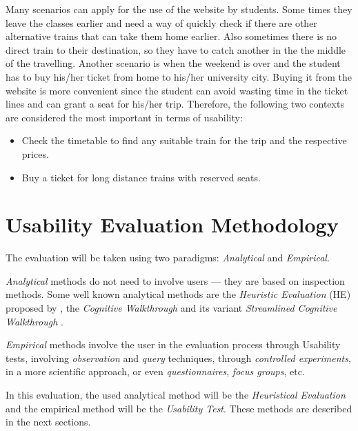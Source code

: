 \documentclass[a4paper]{article}
\begin{document}
Many scenarios can apply for the use of the website by students. Some times they leave the classes earlier and need a way of quickly check if there are other alternative trains that can take them home earlier. Also sometimes there is no direct train to their destination, so they have to catch another in the the middle of the travelling. Another scenario is when the weekend is over and the student has to buy his/her ticket from home to his/her university city. Buying it from the website is more convenient since the student can avoid wasting time in the ticket lines and can grant a seat for his/her trip. Therefore, the following two contexts are considered the most important in terms of usability:

\begin{itemize}
  \item Check the timetable to find any suitable train for the trip and the respective prices.
  \item Buy a ticket for long distance trains with reserved seats.
\end{itemize}

\section{Usability Evaluation Methodology}

The evaluation will be taken using two paradigms: \emph{Analytical} and \emph{Empirical}.

\emph{Analytical} methods do not need to involve users --- they are based on inspection methods. Some well known analytical methods are the \emph{Heuristic Evaluation} (HE) proposed by \citet{nielsen1990heuristic}, the \emph{Cognitive Walkthrough} \citep{wharton1994cognitive} and its variant \emph{Streamlined Cognitive Walkthrough} \citep{spencer2000streamlined}.

\emph{Empirical} methods involve the user in the evaluation process through Usability tests, involving \emph{observation} and \emph{query} techniques, through \emph{controlled experiments}, in a more scientific approach, or even \emph{questionnaires}, \emph{focus groups}, etc. 

In this evaluation, the used analytical method will be the  \emph{Heuristical Evaluation} and the empirical method will be the \emph{Usability Test}. These methods are described in the next sections.



\end{document}
